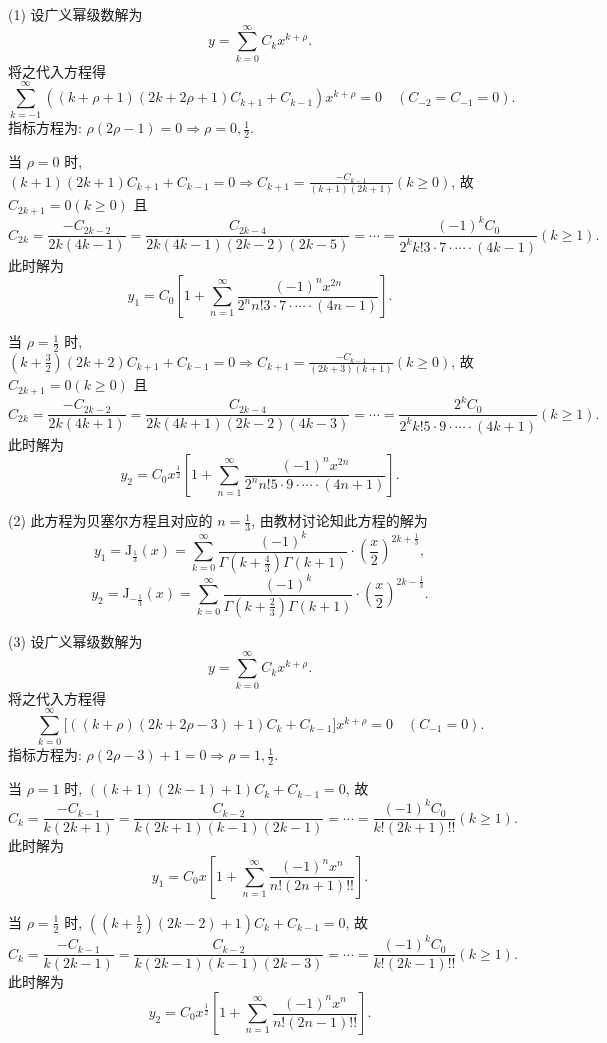 \begin{solve}
  (1) 设广义幂级数解为
  \[y=\sum_{k=0}^{\infty}C_kx^{k+\rho}.\]
  将之代入方程得
  \[\sum_{k=-1}^{\infty}\left((k+\rho+1)(2k+2\rho+1)C_{k+1}+C_{k-1}\right)x^{k+\rho}=0
  \quad (C_{-2}=C_{-1}=0).\]
  指标方程为: $\rho(2\rho-1)=0\Rightarrow\rho=0,\frac{1}{2}$.

  当 $\rho=0$ 时, $(k+1)(2k+1)C_{k+1}+C_{k-1}=0\Rightarrow C_{k+1}=\frac{-C_{k-1}}{(k+1)(2k+1)}(k\geq 0)$, 故 $C_{2k+1}=0(k\geq 0)$ 且
  \[C_{2k}=\frac{-C_{2k-2}}{2k(4k-1)}=\frac{C_{2k-4}}{2k(4k-1)(2k-2)(2k-5)}=\cdots=\frac{(-1)^kC_0}{2^kk!3\cdot7\cdot\cdots\cdot(4k-1)}(k\geq 1).\]
  此时解为
  \[y_1=C_0\left[1+\sum_{n=1}^{\infty}\frac{(-1)^nx^{2n}}{2^nn!3\cdot7\cdot\cdots\cdot(4n-1)}\right].\]

  当 $\rho=\frac{1}{2}$ 时, 
  $(k+\frac{3}{2})(2k+2)C_{k+1}+C_{k-1}=0\Rightarrow C_{k+1}=\frac{-C_{k-1}}{(2k+3)(k+1)}(k\geq0)$, 
  故 $C_{2k+1}=0(k\geq 0)$ 且
  \[C_{2k}=\frac{-C_{2k-2}}{2k(4k+1)}=\frac{C_{2k-4}}{2k(4k+1)(2k-2)(4k-3)}=\cdots=\frac{2^kC_0}{2^kk!5\cdot9\cdot\cdots\cdot(4k+1)}(k\geq 1).\]
  此时解为
  \[y_2=C_0x^{\frac{1}{2}}\left[1+\sum_{n=1}^{\infty}\frac{(-1)^nx^{2n}}{2^nn!5\cdot9\cdot\cdots\cdot(4n+1)}\right].\]

  (2) 此方程为贝塞尔方程且对应的 $n=\frac{1}{3}$, 由教材讨论知此方程的解为
  \[y_1=\mathrm{J}_{\frac{1}{3}}(x)=\sum_{k=0}^{\infty}\frac{(-1)^k}{\Gamma\left(k+\frac{4}{3}\right)\Gamma(k+1)}\cdot\left(\frac{x}{2}\right)^{2k+\frac{1}{3}},\]
  \[y_2=\mathrm{J}_{-\frac{1}{3}}(x)=\sum_{k=0}^{\infty}\frac{(-1)^k}{\Gamma\left(k+\frac{2}{3}\right)\Gamma(k+1)}\cdot\left(\frac{x}{2}\right)^{2k-\frac{1}{3}}.\]

  (3) 设广义幂级数解为
  \[y=\sum_{k=0}^{\infty}C_kx^{k+\rho}.\]
  将之代入方程得
  \[\sum_{k=0}^{\infty}\big[((k+\rho)(2k+2\rho-3)+1)C_k+C_{k-1}\big]x^{k+\rho}=0
    \quad (C_{-1}=0).\]
  指标方程为: $\rho(2\rho-3)+1=0\Rightarrow\rho=1,\frac{1}{2}$.

  当 $\rho=1$ 时, $((k+1)(2k-1)+1)C_k+C_{k-1}=0$, 故
  \[C_k=\frac{-C_{k-1}}{k(2k+1)}=\frac{C_{k-2}}{k(2k+1)(k-1)(2k-1)}=\cdots=\frac{(-1)^kC_0}{k!(2k+1)!!}(k\geq 1).\]
  此时解为
  \[y_1=C_0x\left[1+\sum_{n=1}^{\infty}\frac{(-1)^nx^n}{n!(2n+1)!!}\right].\]

  当 $\rho=\frac{1}{2}$ 时, $((k+\frac{1}{2})(2k-2)+1)C_k+C_{k-1}=0$, 故
  \[C_k=\frac{-C_{k-1}}{k(2k-1)}=\frac{C_{k-2}}{k(2k-1)(k-1)(2k-3)}=\cdots=\frac{(-1)^kC_0}{k!(2k-1)!!}(k\geq 1).\]
  此时解为
  \[y_2=C_0x^{\frac{1}{2}}\left[1+\sum_{n=1}^{\infty}\frac{(-1)^nx^n}{n!(2n-1)!!}\right].\]


\end{solve}
